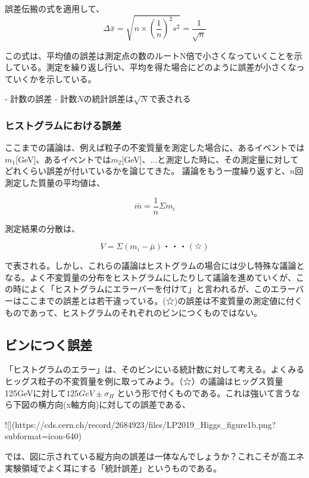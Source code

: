 \documentclass[uplatex]{jreport}
\begin{document}
誤差伝搬の式を適用して、
\begin{equation}
  \Delta \bar{x} = \sqrt{n\times\left(\frac{1}{n}\right)^2s^2}=\frac{1}{\sqrt{n}}
\end{equation}

この式は、平均値の誤差は測定点の数のルートN倍で小さくなっていくことを示している。測定を繰り返し行い、平均を得た場合にどのように誤差が小さくなっていくかを示している。

- 計数の誤差
- 計数$N$の統計誤差は$\sqrt{N}$で表される

\subsubsection{ヒストグラムにおける誤差}
ここまでの議論は、例えば粒子の不変質量を測定した場合に、あるイベントでは$m_1$[GeV]、あるイベントでは$m_2$[GeV]、...と測定した時に、その測定量に対してどれくらい誤差が付いているかを論じてきた。
議論をもう一度繰り返すと、$n$回測定した質量の平均値は、

\begin{equation}
  \bar{m}=\frac{1}{n}\Sigma m_i
\end{equation}

測定結果の分散は、

\begin{equation}
  V=\Sigma(m_i-\bar{\mu})・・・(☆)
\end{equation}

で表される。しかし、これらの議論はヒストグラムの場合には少し特殊な議論となる。よく不変質量の分布をヒストグラムにしたりして議論を進めていくが、この時によく「ヒストグラムにエラーバーを付けて」と言われるが、このエラーバーはここまでの誤差とは若干違っている。(☆)の誤差は不変質量の測定値に付くものであって、ヒストグラムのそれぞれのビンにつくものではない。

\subsection{ビンにつく誤差}
「ヒストグラムのエラー」は、そのビンにいる統計数に対して考える。よくみるヒッグス粒子の不変質量を例に取ってみよう。（☆）の議論はヒッグス質量125GeVに対して$125GeV \pm \sigma_{H}$ という形で付くものである。これは強いて言うなら下図の横方向(x軸方向)に対しての誤差である、

![](https://cds.cern.ch/record/2684923/files/LP2019_Higgs_figure1b.png?subformat=icon-640)

では、図に示されている縦方向の誤差は一体なんでしょうか？これこそが高エネ実験領域でよく耳にする「統計誤差」というものである。
\end{document}
